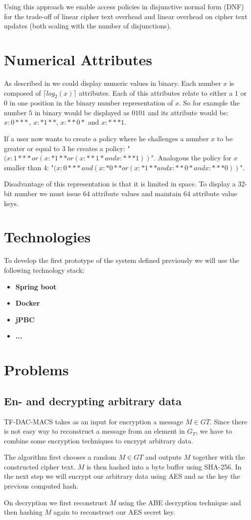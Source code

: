 Using this approach we enable access policies in disjunctive normal form (DNF) for the trade-off of linear cipher text overhead and linear overhead on cipher text updates (both scaling with the number of disjunctions).

\section{Numerical Attributes}
As described in \cite{bethencourt2007ciphertext} we could display numeric values in binary. Each number $x$ is composed of $\lceil log_2(x) \rceil$ attributes. Each of this attributes relate to either a $1$ or $0$ in one position in the binary number representation of $x$. So for example the number $5$ in binary would be displayed as $0101$ and its attribute would be: $x:0***$, $x:*1**$, $x:**0*$ and $x:***1$. 

If a user now wants to create a policy where he challenges a number $x$ to be greater or equal to $3$ he creates a policy: "$(x:1*** or (x:*1** or (x:**1* and x:***1))$". Analogous the policy for $x$ smaller than $4$: "$(x:0*** and (x:*0** or (x:*1** and x:**0* and x:***0))$".

Disadvantage of this representation is that it is limited in space. To display a 32-bit number we must issue 64 attribute values and maintain 64 attribute value keys. 


\section{Technologies}
To develop the first prototype of the system defined previously we will use the following technology stack:

\begin{itemize}
  \item \textbf{Spring boot}
  \item \textbf{Docker}
  \item \textbf{jPBC} \cite{ISCC:DecIov11}
  \item \textbf{...}
\end{itemize}

\section{Problems}

\subsection{En- and decrypting arbitrary data}
TF-DAC-MACS takes as an input for encryption a message $M \in GT$. Since there is not easy way to reconstruct a message from an element in $G_T$, we have to combine some encryption techniques to encrypt arbitrary data. 

The algorithm first chooses a random $M \in GT$ and outputs $M$ together with the constructed cipher text. $M$ is then hashed into a byte buffer using \ac{SHA}-256. In the next step we will encrypt our arbitrary data using \ac{AES} and as the key the previous computed hash. 

On decryption we first reconstruct $M$ using the ABE decryption technique and then hashing $M$ again to reconstruct our AES secret key. 